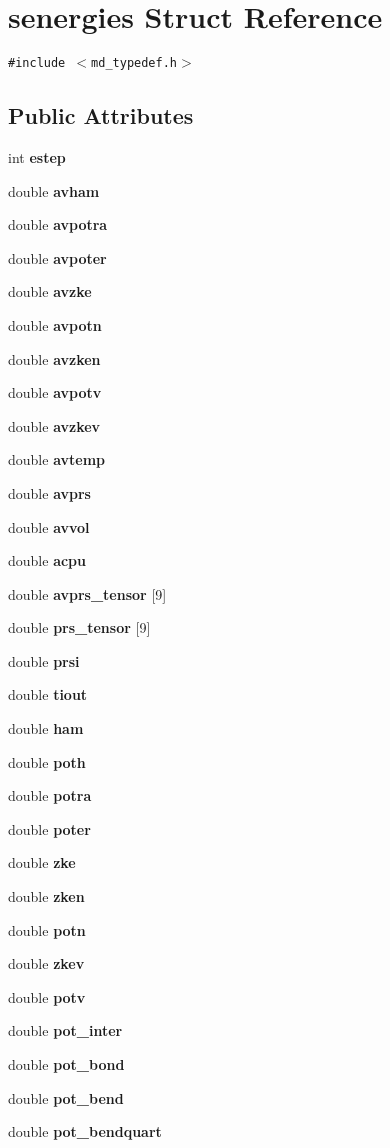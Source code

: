 \section{senergies Struct Reference}
\label{structsenergies}
{\tt \#include $<$md\_\-typedef.h$>$}

\subsection*{Public Attributes}
\begin{CompactItemize}
\item 
int {\bf estep}
\item 
double {\bf avham}
\item 
double {\bf avpotra}
\item 
double {\bf avpoter}
\item 
double {\bf avzke}
\item 
double {\bf avpotn}
\item 
double {\bf avzken}
\item 
double {\bf avpotv}
\item 
double {\bf avzkev}
\item 
double {\bf avtemp}
\item 
double {\bf avprs}
\item 
double {\bf avvol}
\item 
double {\bf acpu}
\item 
double {\bf avprs\_\-tensor} [9]
\item 
double {\bf prs\_\-tensor} [9]
\item 
double {\bf prsi}
\item 
double {\bf tiout}
\item 
double {\bf ham}
\item 
double {\bf poth}
\item 
double {\bf potra}
\item 
double {\bf poter}
\item 
double {\bf zke}
\item 
double {\bf zken}
\item 
double {\bf potn}
\item 
double {\bf zkev}
\item 
double {\bf potv}
\item 
double {\bf pot\_\-inter}
\item 
double {\bf pot\_\-bond}
\item 
double {\bf pot\_\-bend}
\item 
double {\bf pot\_\-bendquart}

\end{CompactItemize}

